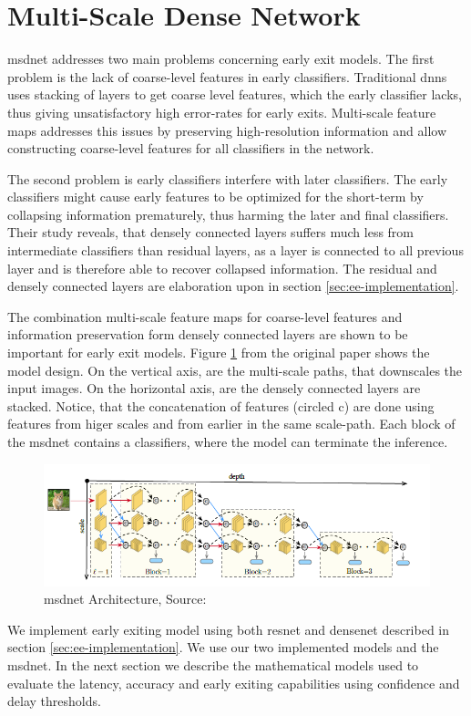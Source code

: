\section{Multi-Scale Dense Network} \label{sec:ee-msdnet}

\gls{msdnet} \cite{huang_densely_2016} addresses two main problems concerning early exit models. The first problem is the lack of coarse-level features in early classifiers. Traditional \gls{dnn}s uses stacking of layers to get coarse level features, which the early classifier lacks, thus giving unsatisfactory high error-rates for early exits. Multi-scale feature maps addresses this issues by preserving high-resolution information and allow constructing coarse-level features for all classifiers in the network. 

The second problem is early classifiers interfere with later classifiers. The early classifiers might cause early features to be optimized for the short-term by collapsing information prematurely, thus harming the later and final classifiers. Their study reveals, that densely connected layers suffers much less from intermediate classifiers than residual layers, as a layer is connected to all previous layer and is therefore able to recover collapsed information. The residual and densely connected layers are elaboration upon in section \ref{sec:ee-implementation}.


The combination multi-scale feature maps for coarse-level features and information preservation form densely connected layers are shown to be important for early exit models. Figure \ref{fig:msdnet} from the original paper shows the model design. On the vertical axis, are the multi-scale paths, that downscales the input images. On the horizontal axis, are the densely connected layers are stacked. Notice, that the concatenation of features (circled c) are done using features from higer scales and from earlier in the same scale-path. Each block of the \gls{msdnet} contains a classifiers, where the model can terminate the inference.
\begin{figure}
	\centering
	\includegraphics[width=\linewidth]{figures/models/msdnet}
	\caption[\gls{msdnet} Architecture]{\gls{msdnet} Architecture, Source:  \cite{huang_multi-scale_2017}}
	\label{fig:msdnet}
\end{figure}
We implement early exiting model using both \gls{resnet} and \gls{densenet} described in section \ref{sec:ee-implementation}. We use our two implemented models and the \gls{msdnet}.
In the next section we describe the mathematical models used to evaluate the latency, accuracy and early exiting capabilities using confidence and delay thresholds.

